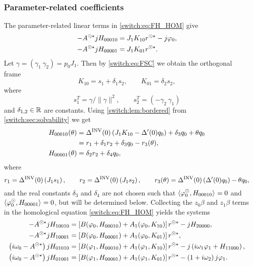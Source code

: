 \subsubsection{Parameter-related coefficients}
The parameter-related linear terms in \cref{switch:eq:FH_HOM} give
\begin{align*}
-A^{\odot\star} jH_{00010} & = J_{1}K_{10}r^{\odot\star}-j\varphi_{0},\\
-A^{\odot\star} jH_{00001} & = J_{1}K_{01}r^{\odot\star}.
\end{align*}
Let $\gamma=(\gamma_{1}~\gamma_{2})=p_{0}J_{1}$. Then by \cref{switch:eq:FSC} we obtain the orthogonal frame
\begin{equation}
K_{10}=s_{1}+\delta_{1}s_{2},\qquad K_{01}=\delta_{2}s_{2},\label{switch:eq:FH_Ks}
\end{equation}
where
\[
s_{1}^{T}=\gamma/\|\gamma\|^{2},\qquad s_{2}^{T}=(-\gamma_{2}~\gamma_{1})
\]
and $\delta_{1,2}\in \mathbb{R}$ are constants. Using \cref{switch:lem:bordered} from \cref{switch:sec:solvability} we get
\begin{equation}
\begin{aligned}
H_{00010}(\theta) & =\Delta^{\mathrm{INV}}(0)\left(J_{1}K_{10}-\Delta'(0)q_{0}\right)+\delta_{3}q_{0}+\theta q_{0}\\
 & =r_{1}+\delta_{1}r_{2}+\delta_{3}q_{0}-r_{3}(\theta),\\
H_{00001}(\theta) & = \delta_{2}r_{2}+\delta_{4}q_{0},
\end{aligned}\label{switch:eq:FH_H000mu}
\end{equation}
where
\[
r_{1}=\Delta^{\mathrm{INV}}(0)\left(J_{1}s_{1}\right),\qquad r_{2}=\Delta^{\mathrm{INV}}(0)\left(J_{1}s_{2}\right),\qquad r_{3}(\theta)=\Delta^{\mathrm{INV}}(0)\left(\Delta'(0)q_{0}\right)-\theta q_{0},
\]
and the real constants $\delta_{3}$ and $\delta_{4}$ are not chosen such that $\langle \varphi_0^{\odot},H_{00010} \rangle_{} =0$ and $\langle \varphi_0^{\odot},H_{00001} \rangle_{} =0$, but will be determined below. Collecting the $z_{0}\beta$ and $z_{1}\beta$ terms in the homological equation \cref{switch:eq:FH_HOM} yields the systems
\begin{align} \label{switch:eq:FH_secondorder_systems}
\begin{split}
-A^{\odot\star} jH_{10010} & = \left[ B(\varphi_{0},H_{00010}) +A_{1}(\varphi_{0},K_{10}) \right] r^{\odot\star} - jH_{20000},\\
-A^{\odot\star} jH_{10001} & = \left[ B(\varphi_{0},H_{00001})+A_{1}(\varphi_{0},K_{01}) \right] r^{\odot\star},\\
\left(i\omega_{0}-A^{\odot\star}\right) jH_{01010} & = \left[ B(\varphi_{1},H_{00010})+A_{1}(\varphi_{1},K_{10}) \right] r^{\odot\star}
	-j\left(i\omega_{1} \varphi_{1}+H_{11000}\right),\\
\left(i\omega_{0}-A^{\odot\star}\right) jH_{01001}
	& = \left[ B(\varphi_{1},H_{00001})+A_{1}(\varphi_{1},K_{01}) \right] r^{\odot\star}-\left(1+i\omega_{2}\right) j\varphi_{1}.
\end{split}
\end{align}
